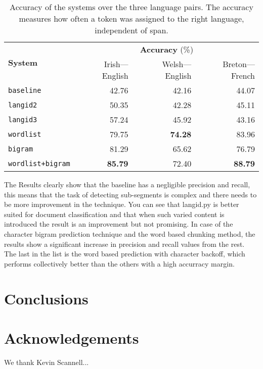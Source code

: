 \documentclass[11pt]{article}
\begin{document}
\begin{table}
\begin{center}
\begin{tabular}{|l|r|r|r|}
\hline
\multirow{2}{*}{\textbf{System}} &  \multicolumn{3}{c|}{\textbf{Accuracy} (\%)} \\\cline{2-4}
       &   Irish---English & Welsh---English & Breton---French \\ 
\hline
\texttt{baseline} & 42.76 & 42.16 & 44.07 \\
\hline
\texttt{langid2} & 50.35 & 42.28 & 45.11  \\
\hline
\texttt{langid3} & 57.24 & 45.92 & 43.16 \\
\hline
\texttt{wordlist} & 79.75 & \textbf{74.28} & 83.96 \\
\hline
\texttt{bigram} & 81.29 & 65.62 & 76.79 \\
\hline
\texttt{wordlist+bigram} & \textbf{85.79} & 72.40 & \textbf{88.79} \\
\hline
\end{tabular}
\end{center}
\label{table:accuracy}
\caption{Accuracy of the systems over the three language pairs. The accuracy measures how often a token
  was assigned to the right language, independent of span.}
\end{table}



The Results clearly show that the baseline has a negligible precision and recall, this means that the task of detecting sub-segments is complex and there needs to be more improvement in the technique. You can see that langid.py is better suited for document classification and that when such varied content is introduced the result is an improvement but not promising. In case of the character bigram prediction technique and the word based chunking method, the results show a significant increase in precision and recall values from the rest. The last in the list is the word based prediction with character backoff, which performs collectively better than the others with a high accurracy margin. \\


\section{Conclusions}
\label{sec:conclusions}



\section*{Acknowledgements}

We thank Kevin Scannell... 



\end{document}
